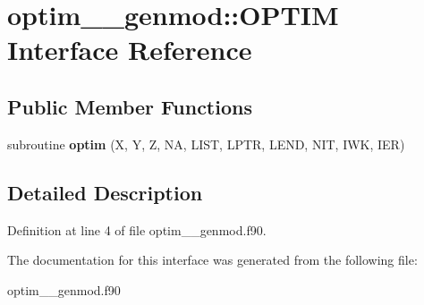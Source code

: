\hypertarget{interfaceoptim____genmod_1_1_o_p_t_i_m}{\section{optim\+\_\+\+\_\+genmod\+:\+:O\+P\+T\+I\+M Interface Reference}
\label{interfaceoptim____genmod_1_1_o_p_t_i_m}
}
\subsection*{Public Member Functions}
\begin{DoxyCompactItemize}
\item 
\hypertarget{interfaceoptim____genmod_1_1_o_p_t_i_m_a33bf0af5c71af8cb89249bb8c92a89c4}{subroutine {\bfseries optim} (X, Y, Z, N\+A, L\+I\+S\+T, L\+P\+T\+R, L\+E\+N\+D, N\+I\+T, I\+W\+K, I\+E\+R)}\label{interfaceoptim____genmod_1_1_o_p_t_i_m_a33bf0af5c71af8cb89249bb8c92a89c4}

\end{DoxyCompactItemize}


\subsection{Detailed Description}


Definition at line 4 of file optim\+\_\+\+\_\+genmod.\+f90.



The documentation for this interface was generated from the following file\+:\begin{DoxyCompactItemize}
\item 
optim\+\_\+\+\_\+genmod.\+f90\end{DoxyCompactItemize}
